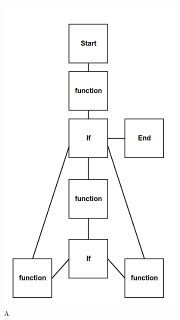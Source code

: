 \documentclass[14pt]{matmex-diploma}
\begin{document}
\begin{figure}
    \centering
    \begin{subfigure}[b]{0.4\textwidth}
        \includegraphics[width=\textwidth]{images/blockScheme1.png}
        \caption{A}
        \label{fig:A}
    \end{subfigure}
    ~ %
    \begin{subfigure}[b]{0.4\textwidth}

\end{subfigure}
\end{figure}
\end{document}
